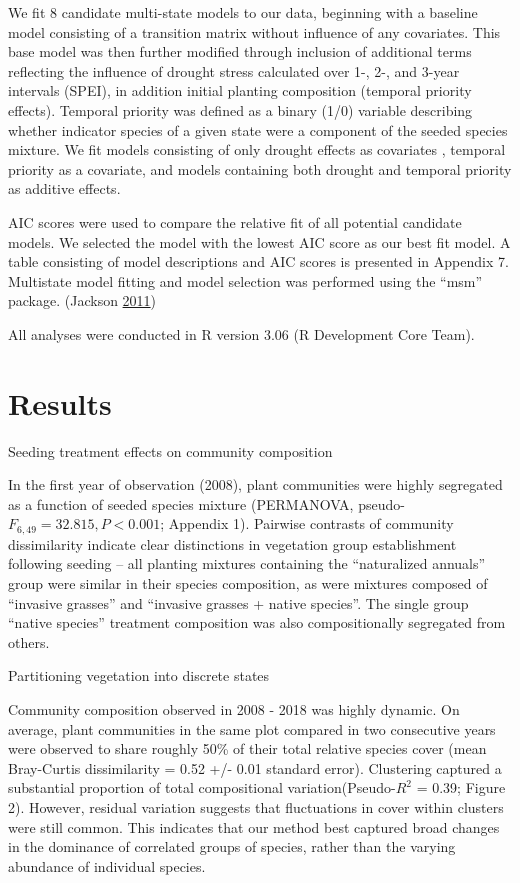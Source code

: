 \documentclass[twoside,12pt,final]{ucthesis-CA2012}
\begin{document}
\begin{ucmainmatter}
We fit 8 candidate multi-state models to our data, beginning with a baseline model consisting of a transition matrix without influence of any covariates.
This base model was then further modified through inclusion of additional terms reflecting the influence of drought stress calculated over 1-, 2-, and 3-year intervals (SPEI), in addition initial planting composition (temporal priority effects).
Temporal priority was defined as a binary (1/0) variable describing whether indicator species of a given state were a component of the seeded species mixture.
We fit models consisting of only drought effects as covariates , temporal priority as a covariate, and models containing both drought and temporal priority as additive effects.

AIC scores were used to compare the relative fit of all potential candidate models. We selected the model with the lowest AIC score as our best fit model.
A table consisting of model descriptions and AIC scores is presented in Appendix 7. Multistate model fitting and model selection was performed using the ``msm'' package. (Jackson \protect\hyperlink{ref-Jackson2011}{2011})

All analyses were conducted in R version 3.06 (R Development Core Team).

\hypertarget{results}{%
\section{Results}\label{results}}

Seeding treatment effects on community composition

In the first year of observation (2008), plant communities were highly segregated as a function of seeded species mixture (PERMANOVA, pseudo-\(F_{6, 49} = 32.815, P < 0.001\); Appendix 1).
Pairwise contrasts of community dissimilarity indicate clear distinctions in vegetation group establishment following seeding -- all planting mixtures containing the ``naturalized annuals'' group were similar in their species composition, as were mixtures composed of ``invasive grasses'' and ``invasive grasses + native species''.
The single group ``native species'' treatment composition was also compositionally segregated from others.

Partitioning vegetation into discrete states

Community composition observed in 2008 - 2018 was highly dynamic.
On average, plant communities in the same plot compared in two consecutive years were observed to share roughly 50\% of their total relative species cover (mean Bray-Curtis dissimilarity = 0.52 +/- 0.01 standard error).
Clustering captured a substantial proportion of total compositional variation(Pseudo-\(R^2\) = 0.39; Figure 2).
However, residual variation suggests that fluctuations in cover within clusters were still common.
This indicates that our method best captured broad changes in the dominance of correlated groups of species, rather than the varying abundance of individual species.


\end{ucmainmatter}
\end{document}
